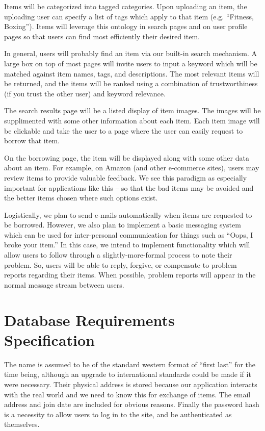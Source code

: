 \documentclass{acm_proc_article-sp}
\begin{document}
Items will be categorized into tagged categories. Upon uploading an item, the uploading user can specify a list of tags which apply to that item (e.g. ``Fitness, Boxing''). Items will leverage this ontology in search pages and on user profile pages so that users can find most efficiently their desired item.

In general, users will probably find an item via our built-in search mechanism. A large box on top of most pages will invite users to input a keyword which will be matched against item names, tags, and descriptions. The most relevant items will be returned, and the items will be ranked using a combination of trustworthiness (if you trust the other user) and keyword relevance.

The search results page will be a listed display of item images. The images will be supplimented with some other information about each item. Each item image will be clickable and take the user to a page where the user can easily request to borrow that item.

On the borrowing page, the item will be displayed along with some other data about an item. For example, on Amazon (and other e-commerce sites), users may review items to provide valuable feedback. We see this paradigm as especially important for applications like this -- so that the bad items may be avoided and the better items chosen where such options exist.

Logistically, we plan to send e-mails automatically when items are requested to be borrowed. However, we also plan to implement a basic messaging system which can be used for inter-personal communication for things such as ``Oops, I broke your item.'' In this case, we
intend to implement functionality which will allow users to follow through a slightly-more-formal process to note their problem. So, users will be able to reply, forgive, or compensate to problem reports regarding their items. When possible, problem reports will appear in the normal message stream between users.

\section{Database Requirements Specification}
The name is assumed to be of the standard western format of ``first last'' for the time being, although an upgrade to international standards could be made if it were necessary. Their physical address is stored because our application interacts with the real world and we need to know this for exchange of items. The email address and join date are included for obvious reasons. Finally the password hash is a necessity to allow users to log in to the site, and be authenticated as themselves.
\end{document}
